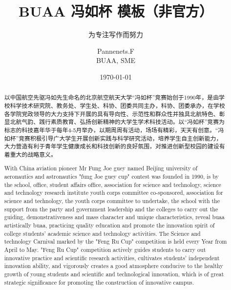 \documentclass[lang=cn,12pt]{frbpaper}
\title{BUAA 冯如杯 \hologo{LaTeX} 模板（非官方）}
\subtitle{为专注写作而努力}
\author{\Large Pannenets.F \\  \Large{BUAA, SME}}
\date{\today}
\begin{document}
\maketitle

\makeabstract

\begin{abstract}
    以中国航空先驱冯如先生命名的北京航空航天大学“冯如杯”竞赛始创于1990年，是由学校科学技术研究院、教务处、学生处、科协、团委共同主办，科协、团委承办，在学校各学院党政领导的大力支持下开展的具有导向性、示范性和群众性并独具北航特色、彰显北航气韵、践行素质教育、弘扬创新精神的大学生学术科技活动。以“冯如杯”竞赛为标志的科技嘉年华于每年4-5月举办，以期周周有活动，场场有精彩，天天有创意。“冯如杯”竞赛积极引导广大学生开展创新实践与科学研究活动，培养学生自主创新能力，大力营造有利于青年学生健康成长和科技创新的良好氛围，对推进创新型校园的建设有着重大的战略意义。
\end{abstract}
\renewcommand{\abstractname}{Abstract}
\clearpage


\begin{abstract}
    With China aviation pioneer Mr Fung Joe guey named Beijing university of aeronautics and astronautics "fung Joe guey cup" contest was founded in 1990, is by the school, office, student affairs office, association for science and technology, science and technology research institute youth corps committee co-sponsored, association for science and technology, the youth corps committee to undertake, the school with the support from the party and government leadership and the colleges to carry out the guiding, demonstrativeness and mass character and unique characteristics, reveal buaa artistically buaa, practicing quality education and promote the innovation spirit of college students' academic science and technology activities. The Science and technology Carnival marked by the "Feng Ru Cup" competition is held every Year from April to May. "Feng Ru Cup" competition actively guides students to carry out innovative practice and scientific research activities, cultivates students' independent innovation ability, and vigorously creates a good atmosphere conducive to the healthy growth of young students and scientific and technological innovation, which is of great strategic significance for promoting the construction of innovative campus.
\end{abstract}
\renewcommand{\abstractname}{\Large\heiti Abstract}
\clearpage
\end{document}
